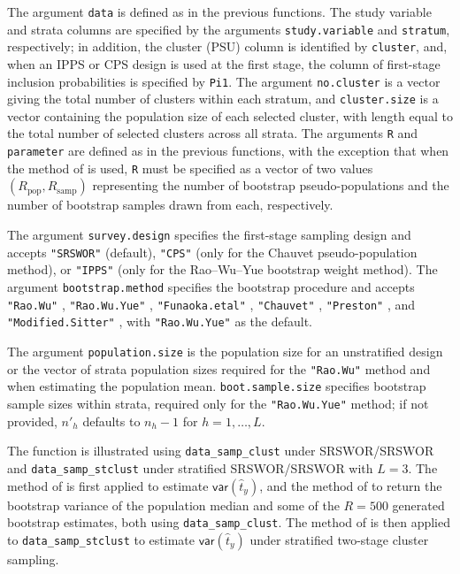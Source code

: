 The argument \texttt{data} is defined as in the previous functions. The study variable and strata columns are specified by the arguments \texttt{study.variable} and \texttt{stratum}, respectively; in addition, the cluster (PSU) column is identified by \texttt{cluster}, and, when an IPPS or CPS design is used at the first stage, the column of first-stage inclusion probabilities is specified by \texttt{Pi1}.
The argument \texttt{no.cluster} is a vector giving the total number of clusters within each stratum, and \texttt{cluster.size} is a vector containing the population size of each selected cluster, with length equal to the total number of selected clusters across all strata. The arguments \texttt{R} and \texttt{parameter} are defined as in the previous functions, with the exception that when the method of \citet{Chauvet:2007} is used, \texttt{R} must be specified as a vector of two values \((R_\text{pop}, R_\text{samp})\) representing the number of bootstrap pseudo-populations and the number of bootstrap samples drawn from each, respectively.

The argument \texttt{survey.design} specifies the first-stage sampling design and accepts \texttt{"SRSWOR"} (default), \texttt{"CPS"} (only for the Chauvet pseudo-population method), or \texttt{"IPPS"} (only for the Rao--Wu--Yue bootstrap weight method). The argument \texttt{bootstrap.method} specifies the bootstrap procedure and accepts \texttt{"Rao.Wu"} \citep{Rao:Wu:1988}, \texttt{"Rao.Wu.Yue"} \citep{Rao:Wu:Yue:1992}, \texttt{"Funaoka.etal"} \citep{Funaoka:Saigo:Sitter:Toida:2006}, \texttt{"Chauvet"} \citep{Chauvet:2007}, \texttt{"Preston"} \citep{Preston:2009}, and \texttt{"Modified.Sitter"} \citep{Chen:Haziza:Mashreghi:2022}, with \texttt{"Rao.Wu.Yue"} as the default.

The argument \texttt{population.size} is the population size for an unstratified design or the vector of strata population sizes required for the \texttt{"Rao.Wu"} method and when estimating the population mean. \texttt{boot.sample.size} specifies bootstrap sample sizes within strata, required only for the \texttt{"Rao.Wu.Yue"} method; if not provided, \(n'_h\) defaults to \(n_h - 1\) for \(h = 1, \ldots, L\).

The function is illustrated using \texttt{data\_samp\_clust} under SRSWOR/SRSWOR and \texttt{data\_samp\_stclust} under stratified SRSWOR/SRSWOR with \(L=3\). The method of \citet{Funaoka:Saigo:Sitter:Toida:2006} is first applied to estimate \(\mathsf{var}(\hat{t}_y)\), and the method of \citet{Rao:Wu:Yue:1992} to return the bootstrap variance of the population median and some of the \(R = 500\) generated bootstrap estimates, both using \texttt{data\_samp\_clust}. The method of \citet{Preston:2009} is then applied to \texttt{data\_samp\_stclust} to estimate \(\mathsf{var}(\hat{t}_y)\) under stratified two-stage cluster sampling.

